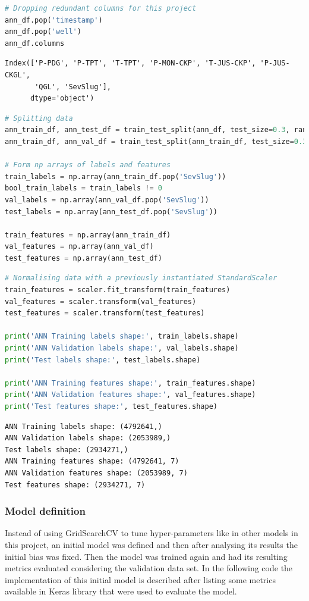 \documentclass{article}
\begin{document}
\begin{lstlisting}[language=Python]
# Dropping redundant columns for this project
ann_df.pop('timestamp')
ann_df.pop('well')
ann_df.columns
\end{lstlisting}
\begin{verbatim}
Index(['P-PDG', 'P-TPT', 'T-TPT', 'P-MON-CKP', 'T-JUS-CKP', 'P-JUS-CKGL',
       'QGL', 'SevSlug'],
      dtype='object')
\end{verbatim}

\begin{lstlisting}[language=Python]
# Splitting data
ann_train_df, ann_test_df = train_test_split(ann_df, test_size=0.3, random_state=42)
ann_train_df, ann_val_df = train_test_split(ann_train_df, test_size=0.3)

# Form np arrays of labels and features
train_labels = np.array(ann_train_df.pop('SevSlug'))
bool_train_labels = train_labels != 0
val_labels = np.array(ann_val_df.pop('SevSlug'))
test_labels = np.array(ann_test_df.pop('SevSlug'))

train_features = np.array(ann_train_df)
val_features = np.array(ann_val_df)
test_features = np.array(ann_test_df)
\end{lstlisting}

\begin{lstlisting}[language=Python]
# Normalising data with a previously instantiated StandardScaler
train_features = scaler.fit_transform(train_features)
val_features = scaler.transform(val_features)
test_features = scaler.transform(test_features)

print('ANN Training labels shape:', train_labels.shape)
print('ANN Validation labels shape:', val_labels.shape)
print('Test labels shape:', test_labels.shape)

print('ANN Training features shape:', train_features.shape)
print('ANN Validation features shape:', val_features.shape)
print('Test features shape:', test_features.shape)
\end{lstlisting}
\begin{verbatim}
ANN Training labels shape: (4792641,)
ANN Validation labels shape: (2053989,)
Test labels shape: (2934271,)
ANN Training features shape: (4792641, 7)
ANN Validation features shape: (2053989, 7)
Test features shape: (2934271, 7)
\end{verbatim}

\subsubsection{Model definition}
Instead of using GridSearchCV to tune hyper-parameters like in other models in this project, an initial model was defined and then after analysing its results the initial bias was fixed. Then the model was trained again and had its resulting metrics evaluated considering the validation data set. In the following code the implementation of this initial model is described after listing some metrics available in Keras library that were used to evaluate the model.  
\end{document}
